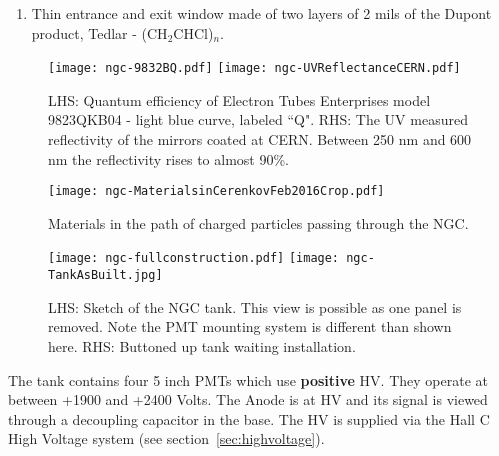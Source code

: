 {\begin{enumerate}
 The PMTs are model 9823QKB04 and tubes with serial numbers 16747,
 16777, 16787 and 16785 are installed to accept light from the mirrors
 in position Top Right, Top Left, Bottom Right and Bottom Left
 respectively while looking along increasing $z$. The tubes are
 surrounded by a mu-metal shield and the HV is distributed to the
 stages by a positive base.
\item Thin entrance and exit window made of two layers of 2 mils of
  the Dupont product, Tedlar - (CH$_2$CHCl)$_n$.
\end{enumerate}
\begin{figure}[!h] %
   \centering
   \texttt{[image: ngc-9832BQ.pdf]}
   \texttt{[image: ngc-UVReflectanceCERN.pdf]}
   \caption{LHS:
     Quantum efficiency of Electron Tubes Enterprises model 9823QKB04
     - light blue curve, labeled ``Q". RHS: The UV measured
     reflectivity of the mirrors coated at CERN. Between 250 nm and
     600 nm the reflectivity rises to almost
     90\%. \label{fig:tubeandmirror}}

\end{figure}
\begin{figure}[!h] %
   \centering
   \texttt{[image: ngc-MaterialsinCerenkovFeb2016Crop.pdf]}
   \caption{Materials
     in the path of charged particles passing through the
     NGC.\label{fig:materials}}
\end{figure}

\begin{figure}[!h] %
   \centering
   \texttt{[image: ngc-fullconstruction.pdf]}
   \texttt{[image: ngc-TankAsBuilt.jpg]}
   \caption{LHS: Sketch of the NGC tank. This view is possible as one
     panel is removed. Note the PMT mounting system is different than
     shown here.  RHS: Buttoned up tank waiting
     installation.\label{fig:Box}}

\end{figure}

\vspace{.25in}

The tank contains four 5 inch PMTs which use {\bf positive} HV. They
operate at between +1900 and +2400 Volts. The Anode is at HV and its
signal is viewed through a decoupling capacitor in the base.  The
HV is supplied via the Hall C High Voltage system (see
section~\ref{sec:highvoltage}).

}
